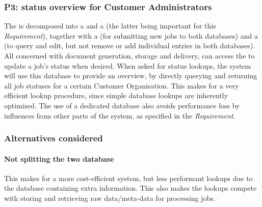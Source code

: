 \subsubsection{P3: status overview for Customer Administrators}\label{march:p3}
The  is decomposed into a  and a  (the latter being important for this \emph{Requirement}), together with a  (for submitting new jobs to both databases) and a  (to query and edit, but not remove or add individual entries in both databases). All  concerned with document generation, storage and delivery, can access the  to update a job's status when desired. When asked for status lookups, the system will use this database to provide an overview, by directly querying and returning all job statuses for a certain Customer Organisation. This makes for a very efficient lookup procedure, since simple database lookups are inherently optimized. The use of a dedicated database also avoids performance loss by influences from other parts of the system, as specified in the \emph{Requirement}.

\subsubsection*{Alternatives considered}
\paragraph{Not splitting the two database} This makes for a more cost-efficient system, but less performant lookups due to the database containing extra information. This also makes the lookups compete with storing and retrieving raw data/meta-data for processing jobs.


